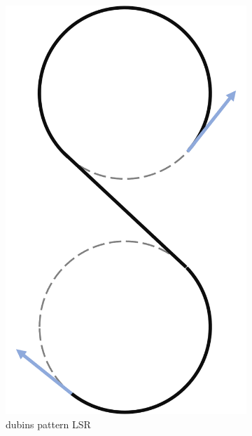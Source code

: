 \begin{figure}
     \hfill
     \begin{subfigure}[b]{0.2\textwidth}
         \centering
         \includegraphics[scale=0.7]{fig/dubins/LSR.png}
         \caption{dubins pattern LSR}
         \label{fig:dubins pattern LSR}
     \end{subfigure}
     \hfill
     \begin{subfigure}[b]{0.2\textwidth}
         \centering

\end{subfigure}
\end{figure}
